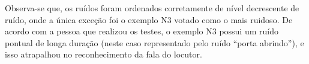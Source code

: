 Observa-se que, os ruídos foram ordenados corretamente de nível decrescente de ruído, onde a única exceção foi o exemplo N3 votado como 
o mais ruidoso. De acordo com a pessoa que realizou os testes, o exemplo N3 possui um ruído pontual
de longa duração (neste caso representado pelo ruído “porta abrindo”), e isso atrapalhou no reconhecimento da fala do locutor.
